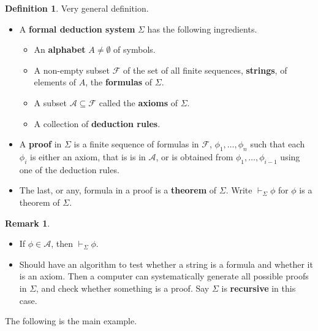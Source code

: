 \documentclass{article}
\newcommand{\A}{\mathcal{A}}
\theoremstyle{definition}\newtheorem{definition}{Definition}[subsection]
\theoremstyle{definition}\newtheorem{remark1}[definition]{Remark}
\theoremstyle{definition}\newtheorem{example1}[definition]{Example}
\theoremstyle{definition}\newtheorem*{remark2}{Remark}
\theoremstyle{definition}\newtheorem*{example2}{Example}
\theoremstyle{definition}\newtheorem*{note}{Note}
\theoremstyle{definition}\newtheorem*{notation}{Notation}
\begin{document}
\begin{definition}
Very general definition.
\begin{itemize}
\item A \textbf{formal deduction system} $ \Sigma $ has the following ingredients.
\begin{itemize}
\item An \textbf{alphabet} $ A \ne \emptyset $ of symbols.
\item A non-empty subset $ \mathcal{F} $ of the set of all finite sequences, \textbf{strings}, of elements of $ A $, the \textbf{formulas} of $ \Sigma $.
\item A subset $ \A \subseteq \mathcal{F} $ called the \textbf{axioms} of $ \Sigma $.
\item A collection of \textbf{deduction rules}.
\end{itemize}
\item A \textbf{proof} in $ \Sigma $ is a finite sequence of formulas in $ \mathcal{F} $, $ \phi_1, \dots, \phi_n $ such that each $ \phi_i $ is either an axiom, that is is in $ \A $, or is obtained from $ \phi_1, \dots, \phi_{i - 1} $ using one of the deduction rules.
\item The last, or any, formula in a proof is a \textbf{theorem} of $ \Sigma $. Write $ \vdash_\Sigma \phi $ for $ \phi $ is a theorem of $ \Sigma $.
\end{itemize}
\end{definition}

\begin{remark2}
\hfill
\begin{itemize}
\item If $ \phi \in \A $, then $ \vdash_\Sigma \phi $.
\item Should have an algorithm to test whether a string is a formula and whether it is an axiom. Then a computer can systematically generate all possible proofs in $ \Sigma $, and check whether something is a proof. Say $ \Sigma $ is \textbf{recursive} in this case.
\end{itemize}
\end{remark2}

The following is the main example.
\end{document}
